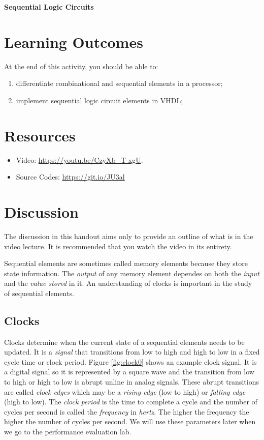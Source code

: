 \documentclass[a4paper, 11pt,oneside]{article}
\begin{document}
\begin{center}
	{\LARGE \textbf{Sequential Logic Circuits}}
\end{center}

\section*{Learning Outcomes}
   At the end of this activity, you should be able to:
   \begin{enumerate}[itemsep=0pt,parsep=0pt]
   	   \item differentiate combinational and sequential elements in a processor;
       \item implement sequential logic circuit elements in VHDL;
   \end{enumerate}   
\tableofcontents

\section{Resources}
\begin{itemize}
	\item Video: \href{https://youtu.be/CzyXb_T-xgU}{https://youtu.be/CzyXb\_T-xgU}.
	\item Source Codes: \href{https://git.io/JU3al}{https://git.io/JU3al}
\end{itemize}	


\section{Discussion}
The discussion in this handout aims only to provide an outline of what is in the video lecture. It is recommended that you watch the video in its entirety.

Sequential elements are sometimes called memory elements because they store state information. The\textit{ output} of any memory element dependes on both the \textit{input} and the \textit{value stored} in it.
An understanding of clocks is important in the study of sequential elements.

\subsection{Clocks}
Clocks determine when the current state of a sequential elements needs to be updated. It is a \textit{signal} that transitions from low to high and high to low in a fixed cycle time or clock period. Figure \ref{fig:clock0} shows an example clock signal. It is a digital signal so it is represented by a square wave and the transition from low to high or high to low is abrupt unline in analog signals. These abrupt transitions are called \textit{clock edges} which may be a \textit{rising edge} (low to high) or \textit{falling edge} (high to low). The \textit{clock period} is the time to complete a cycle and the number of cycles per second is called the \textit{frequency} in \textit{hertz}. The higher the frequency the higher the number of cycles per second. We will use these parameters later when we go to the performance evaluation lab.
\end{document}
